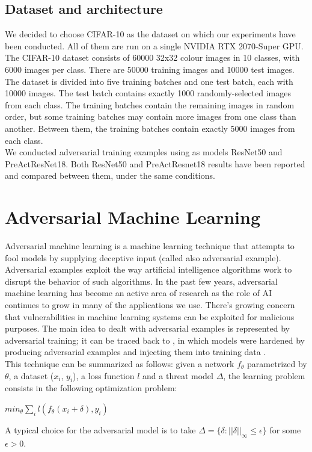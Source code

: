 \documentclass{article}
\begin{document}
\subsection{Dataset and architecture}

We decided to choose CIFAR-10 as the dataset on which our experiments have been conducted. All of them are run on a single NVIDIA RTX 2070-Super GPU.\\
The CIFAR-10 dataset consists of 60000 32x32 colour images in 10 classes, with 6000 images per class. There are 50000 training images and 10000 test images. The dataset is divided into five training batches and one test batch, each with 10000 images. The test batch contains exactly 1000 randomly-selected images from each class. The training batches contain the remaining images in random order, but some training batches may contain more images from one class than another. Between them, the training batches contain exactly 5000 images from each class.\\
We conducted adversarial training examples using as models ResNet50 and PreActResNet18. 
Both ResNet50 and PreActResnet18 results have been reported and compared between them, under the same conditions. 


\section{Adversarial Machine Learning}
Adversarial machine learning is a machine learning technique that attempts to fool models by supplying deceptive input (called also adversarial example). Adversarial examples exploit the way artificial intelligence algorithms work to disrupt the behavior of such algorithms. In the past few years, adversarial machine learning has become an active area of research as the role of AI continues to grow in many of the applications we use. There’s growing concern that vulnerabilities in machine learning systems can be exploited for malicious purposes. The main idea to dealt with adversarial examples is represented by adversarial training; it can be traced back to \cite{GoodfellowEtAl2015}, in which models were hardened by producing adversarial examples and injecting them into training data \cite{ShafahiEtAl2019b}.\\
This technique can be summarized as follows: given a network $f_{\theta}$ parametrized by $\theta$, a dataset ($x_i$, $y_i$), a loss function $l$ and a threat model $\Delta$, the learning problem consists in the following optimization problem:
\begin{center}
	$min_{\theta}{\sum_{i}l(f_{\theta}(x_i + \delta), y_i)}$
\end{center}
A typical choice for the adversarial model is to take $\Delta = \{\delta : ||\delta||_{\infty} \le \epsilon\}$ for some $\epsilon > 0$.
\end{document}
